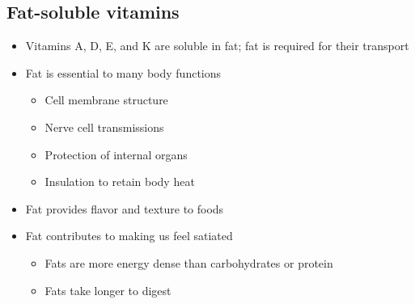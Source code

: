 \documentclass[title={Chapter 5}]{fdsn201notes}
\begin{document}
\subsection{Fat-soluble vitamins}\label{subsec:fat-soluble-vitamins}
\begin{itemize}
	\item Vitamins A, D, E, and K are soluble in fat; fat is required for their transport
	\item Fat is essential to many body functions
	\begin{itemize}
		\item Cell membrane structure
		\item Nerve cell transmissions
		\item Protection of internal organs
		\item Insulation to retain body heat
	\end{itemize}
	\item Fat provides flavor and texture to foods
	\item Fat contributes to making us feel satiated
	\begin{itemize}
		\item Fats are more energy dense than carbohydrates or protein
		\item Fats take longer to digest
	\end{itemize}
\end{itemize}
\end{document}
